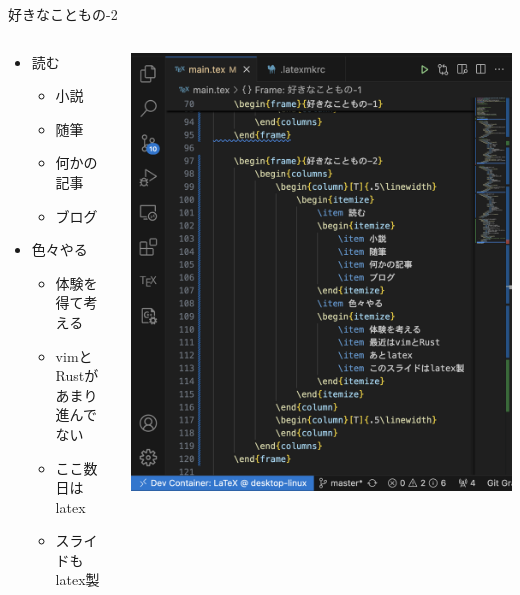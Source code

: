\documentclass[unicode,12pt,aspectratio=169, dvipdfmx]{beamer}
\begin{document}
    \begin{frame}{好きなこともの-2}
        \begin{columns}
            \begin{column}[]{.5\linewidth}
                \begin{itemize}
                    \item 読む
                    \begin{itemize}
                        \item 小説
                        \item 随筆
                        \item 何かの記事
                        \item ブログ
                    \end{itemize}
                    \item 色々やる
                    \begin{itemize}
                        \item 体験を得て考える
                        \item vimとRustがあまり進んでない
                        \item ここ数日はlatex
                        \item スライドもlatex製
                    \end{itemize}
                \end{itemize}
            \end{column}
            \begin{column}[]{.5\linewidth}
                \begin{center}
                    \includegraphics[scale=0.25]{figures/latex.png}

\end{center}
\end{column}
\end{columns}
\end{frame}
\end{document}
